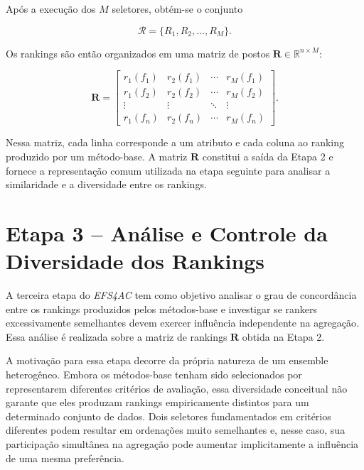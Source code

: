 Após a execução dos $M$ seletores, obtém-se o conjunto

\begin{equation}
    \mathcal{R}
    =
    \{R_1,R_2,\ldots,R_M\}.
\end{equation}

Os rankings são então organizados em uma matriz de postos
$\mathbf{R}\in\mathbb{R}^{n\times M}$:

\begin{equation}
    \mathbf{R}=
    \begin{bmatrix}
        r_1(f_1) & r_2(f_1) & \cdots & r_M(f_1) \\
        r_1(f_2) & r_2(f_2) & \cdots & r_M(f_2) \\
        \vdots   & \vdots   & \ddots & \vdots   \\
        r_1(f_n) & r_2(f_n) & \cdots & r_M(f_n)
    \end{bmatrix}.
    \label{eq:matriz-ranks-ac-efs}
\end{equation}

Nessa matriz, cada linha corresponde a um atributo e cada coluna ao ranking
produzido por um método-base. A matriz $\mathbf{R}$ constitui a saída da
Etapa 2 e fornece a representação comum utilizada na etapa seguinte para
analisar a similaridade e a diversidade entre os rankings.

\section{Etapa 3 -- Análise e Controle da Diversidade dos Rankings}
\label{sec:ac-efs-etapa3}

A terceira etapa do \textit{EFS4AC} tem como objetivo analisar o grau de
concordância entre os rankings produzidos pelos métodos-base e investigar se
rankers excessivamente semelhantes devem exercer influência independente na
agregação. Essa análise é realizada sobre a matriz de rankings $\mathbf{R}$
obtida na Etapa 2.

A motivação para essa etapa decorre da própria natureza de um ensemble
heterogêneo. Embora os métodos-base tenham sido selecionados por representarem
diferentes critérios de avaliação, essa diversidade conceitual não garante que
eles produzam rankings empiricamente distintos para um determinado conjunto de
dados. Dois seletores fundamentados em critérios diferentes podem resultar em
ordenações muito semelhantes e, nesse caso, sua participação simultânea na
agregação pode aumentar implicitamente a influência de uma mesma preferência.

